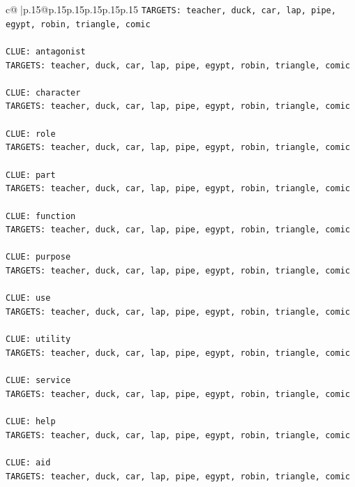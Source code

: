 \documentclass{article}
\begin{document}
{\begin{supertabular}{c@{$\;$}|p{.15\linewidth}@{}p{.15\linewidth}p{.15\linewidth}p{.15\linewidth}p{.15\linewidth}p{.15\linewidth}}
{{{\texttt{TARGETS: teacher, duck, car, lap, pipe, egypt, robin, triangle, comic} \\
\\ 
\texttt{CLUE: antagonist} \\
\texttt{TARGETS: teacher, duck, car, lap, pipe, egypt, robin, triangle, comic} \\
\\ 
\texttt{CLUE: character} \\
\texttt{TARGETS: teacher, duck, car, lap, pipe, egypt, robin, triangle, comic} \\
\\ 
\texttt{CLUE: role} \\
\texttt{TARGETS: teacher, duck, car, lap, pipe, egypt, robin, triangle, comic} \\
\\ 
\texttt{CLUE: part} \\
\texttt{TARGETS: teacher, duck, car, lap, pipe, egypt, robin, triangle, comic} \\
\\ 
\texttt{CLUE: function} \\
\texttt{TARGETS: teacher, duck, car, lap, pipe, egypt, robin, triangle, comic} \\
\\ 
\texttt{CLUE: purpose} \\
\texttt{TARGETS: teacher, duck, car, lap, pipe, egypt, robin, triangle, comic} \\
\\ 
\texttt{CLUE: use} \\
\texttt{TARGETS: teacher, duck, car, lap, pipe, egypt, robin, triangle, comic} \\
\\ 
\texttt{CLUE: utility} \\
\texttt{TARGETS: teacher, duck, car, lap, pipe, egypt, robin, triangle, comic} \\
\\ 
\texttt{CLUE: service} \\
\texttt{TARGETS: teacher, duck, car, lap, pipe, egypt, robin, triangle, comic} \\
\\ 
\texttt{CLUE: help} \\
\texttt{TARGETS: teacher, duck, car, lap, pipe, egypt, robin, triangle, comic} \\
\\ 
\texttt{CLUE: aid} \\
\texttt{TARGETS: teacher, duck, car, lap, pipe, egypt, robin, triangle, comic} \\
}}}
\end{supertabular}}
\end{document}
